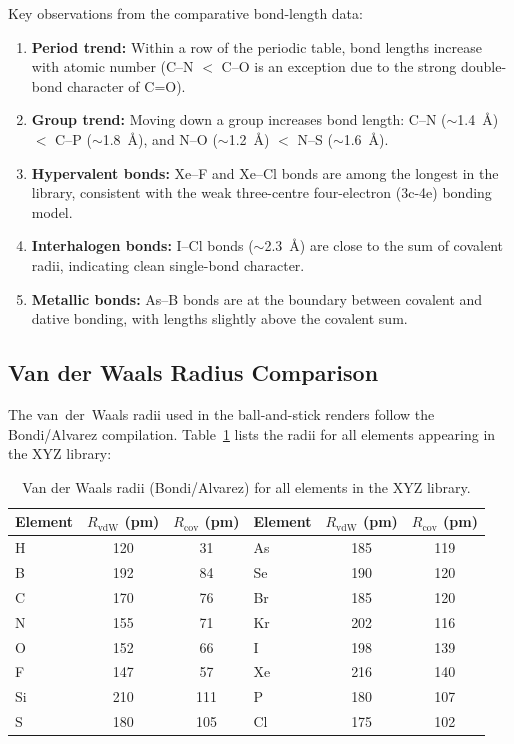 \documentclass[11pt,a4paper]{article}
\begin{document}
\noindent Key observations from the comparative bond-length data:

\begin{enumerate}
  \item \textbf{Period trend:}  Within a row of the periodic table,
        bond lengths increase with atomic number (C--N $<$ C--O is an
        exception due to the strong double-bond character of C=O).
  \item \textbf{Group trend:}  Moving down a group increases bond
        length: C--N ($\sim$1.4~\AA) $<$ C--P ($\sim$1.8~\AA),
        and N--O ($\sim$1.2~\AA) $<$ N--S ($\sim$1.6~\AA).
  \item \textbf{Hypervalent bonds:}  Xe--F and Xe--Cl bonds are among
        the longest in the library, consistent with the weak
        three-centre four-electron (3c-4e) bonding model.
  \item \textbf{Interhalogen bonds:}  I--Cl bonds ($\sim$2.3~\AA) are
        close to the sum of covalent radii, indicating clean single-bond
        character.
  \item \textbf{Metallic bonds:}  As--B bonds are at the boundary
        between covalent and dative bonding, with lengths slightly above
        the covalent sum.
\end{enumerate}

\subsection{Van der Waals Radius Comparison}

The van~der~Waals radii used in the ball-and-stick renders follow the
Bondi/Alvarez compilation.  Table~\ref{tab:vdw_library} lists the
radii for all elements appearing in the XYZ library:

\begin{table}[H]
\centering
\caption{Van der Waals radii (Bondi/Alvarez) for all elements in the XYZ library.}
\label{tab:vdw_library}
\begin{tabular}{lcc|lcc}
\toprule
\textbf{Element} & \textbf{$R_{\text{vdW}}$ (pm)} & \textbf{$R_{\text{cov}}$ (pm)}
& \textbf{Element} & \textbf{$R_{\text{vdW}}$ (pm)} & \textbf{$R_{\text{cov}}$ (pm)} \\
\midrule
H   & 120 &  31 & As  & 185 & 119 \\
B   & 192 &  84 & Se  & 190 & 120 \\
C   & 170 &  76 & Br  & 185 & 120 \\
N   & 155 &  71 & Kr  & 202 & 116 \\
O   & 152 &  66 & I   & 198 & 139 \\
F   & 147 &  57 & Xe  & 216 & 140 \\
Si  & 210 & 111 & P   & 180 & 107 \\
S   & 180 & 105 & Cl  & 175 & 102 \\
\bottomrule
\end{tabular}
\end{table}
\end{document}
